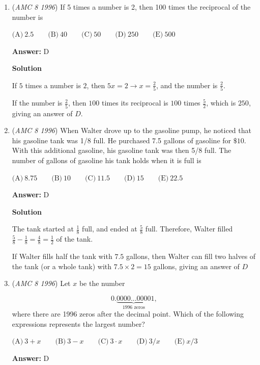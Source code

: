 \begin{enumerate}
 


	\item (\textit{AMC 8 1996}) If 5 times a number is 2, then 100 times the reciprocal of the number is


 $\text{(A)}\ 2.5 \qquad \text{(B)}\ 40 \qquad \text{(C)}\ 50 \qquad \text{(D)}\ 250 \qquad \text{(E)}\ 500$

 \textbf{Answer: }D



\textbf{Solution}

If $5$ times a number is $2$, then $5x = 2 \rightarrow x = \frac{2}{5}$, and the number is $\frac{2}{5}$.

 If the number is $\frac{2}{5}$, then $100$ times its reciprocal is $100$ times $\frac{5}{2}$, which is $250$, giving an answer of $\boxed{D}$.

 


	\item (\textit{AMC 8 1996}) When Walter drove up to the gasoline pump, he noticed that his gasoline tank was 1/8 full.  He purchased 7.5 gallons of gasoline for $\$10$.  With this additional gasoline, his gasoline tank was then 5/8 full.  The number of gallons of gasoline his tank holds when it is full is


 $\text{(A)}\ 8.75 \qquad \text{(B)}\ 10 \qquad \text{(C)}\ 11.5 \qquad \text{(D)}\ 15 \qquad \text{(E)}\ 22.5$

 \textbf{Answer: }D



\textbf{Solution}

The tank started at $\frac{1}{8}$ full, and ended at $\frac{5}{8}$ full.  Therefore, Walter filled $\frac{5}{8} - \frac{1}{8} = \frac{4}{8} = \frac{1}{2}$ of the tank.

 If Walter fills half the tank with $7.5$ gallons, then Walter can fill two halves of the tank (or a whole tank) with $7.5 \times 2 = 15$ gallons, giving an answer of $\boxed{D}$



	\item (\textit{AMC 8 1996}) Let $x$ be the number

 \[0. \underbrace{0000...0000}_{1996\text{ zeros}}1,\]
where there are 1996 zeros after the decimal point.  Which of the following expressions represents the largest number?


 $\text{(A)}\ 3+x \qquad \text{(B)}\ 3-x \qquad \text{(C)}\ 3\cdot x \qquad \text{(D)}\ 3/x \qquad \text{(E)}\ x/3$

 \textbf{Answer: }D




\end{enumerate}
